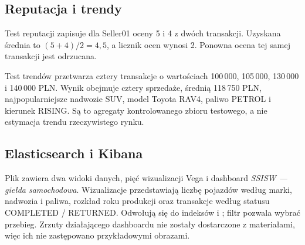 \subsection{Reputacja i trendy}
Test reputacji zapisuje dla Seller01 oceny 5 i 4 z dwóch transakcji.
Uzyskana średnia to $(5+4)/2=4{,}5$, a licznik ocen wynosi 2.
Ponowna ocena tej samej transakcji jest odrzucana.

Test trendów przetwarza cztery transakcje o wartościach 100\,000,
105\,000, 130\,000 i 140\,000 PLN. Wynik obejmuje cztery sprzedaże,
średnią 118\,750 PLN, najpopularniejsze nadwozie SUV, model Toyota RAV4,
paliwo PETROL i kierunek RISING. Są to agregaty kontrolowanego
zbioru testowego, a nie estymacja trendu rzeczywistego rynku.

\subsection{Elasticsearch i Kibana}
Plik  zawiera dwa widoki danych, pięć
wizualizacji Vega i dashboard \emph{SSISW --- giełda samochodowa}.
Wizualizacje przedstawiają liczbę pojazdów według marki, nadwozia
i paliwa, rozkład roku produkcji oraz transakcje według statusu
COMPLETED / RETURNED. Odwołują się do indeksów 
i ; filtr  pozwala wybrać przebieg.
Zrzuty działającego dashboardu nie zostały dostarczone z materiałami,
więc ich nie zastępowano przykładowymi obrazami.

